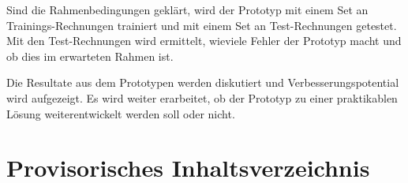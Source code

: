 \documentclass[12pt, twoside, table]{extarticle}
\begin{document}
Sind die Rahmenbedingungen geklärt, wird der Prototyp mit einem Set an Trainings-Rechnungen trainiert und mit einem Set an Test-Rechnungen getestet. Mit den Test-Rechnungen wird ermittelt, wieviele Fehler der Prototyp macht und ob dies im erwarteten Rahmen ist.

Die Resultate aus dem Prototypen werden diskutiert und Verbesserungspotential wird aufgezeigt. Es wird weiter erarbeitet, ob der Prototyp zu einer praktikablen Lösung weiterentwickelt werden soll oder nicht.

 
\newpage
\section{Provisorisches Inhaltsverzeichnis} 

\end{document}
